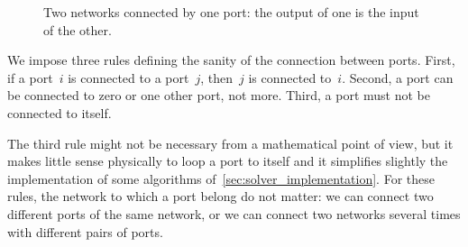 \begin{figure}[hbtp]
    \centering
    
    \caption{Two networks connected by one port: the output of one is the input of the other.}
    \label{fig:output_g_is_input_h}
\end{figure}

We impose three rules defining the sanity of the connection between ports.
First, if a port~$i$ is connected to a port~$j$, then~$j$ is connected to~$i$.
Second, a port can be connected to zero or one other port, not more.
Third, a port must not be connected to itself.

The third rule might not be necessary from a mathematical point of view, but it makes little sense physically to loop a port to itself and it simplifies slightly the implementation of some algorithms of~\cref{sec:solver_implementation}.
For these rules, the network to which a port belong do not matter: we can connect two different ports of the same network, or we can connect two networks several times with different pairs of ports.

